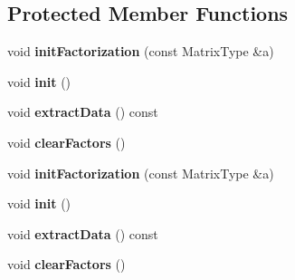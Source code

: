 \subsection*{Protected Member Functions}
\begin{DoxyCompactItemize}
\item 
\mbox{\label{class_eigen_1_1_super_l_u_base_a3665a6637d5a7f367237b82c8bfec851}} 
void {\bfseries init\+Factorization} (const Matrix\+Type \&a)
\item 
\mbox{\label{class_eigen_1_1_super_l_u_base_a4a4929ff39e85af22a96f7509ab2bb82}} 
void {\bfseries init} ()
\item 
\mbox{\label{class_eigen_1_1_super_l_u_base_a0a163728356b4dcca91e4ed7124e6f8e}} 
void {\bfseries extract\+Data} () const
\item 
\mbox{\label{class_eigen_1_1_super_l_u_base_a6a3ab89de6a4b9091ac6494d860967bd}} 
void {\bfseries clear\+Factors} ()
\item 
\mbox{\label{class_eigen_1_1_super_l_u_base_a3665a6637d5a7f367237b82c8bfec851}} 
void {\bfseries init\+Factorization} (const Matrix\+Type \&a)
\item 
\mbox{\label{class_eigen_1_1_super_l_u_base_a4a4929ff39e85af22a96f7509ab2bb82}} 
void {\bfseries init} ()
\item 
\mbox{\label{class_eigen_1_1_super_l_u_base_a6b685c3d3953167293bee80e6e641ceb}} 
void {\bfseries extract\+Data} () const
\item 
\mbox{\label{class_eigen_1_1_super_l_u_base_a6a3ab89de6a4b9091ac6494d860967bd}} 
void {\bfseries clear\+Factors} ()
\end{DoxyCompactItemize}
